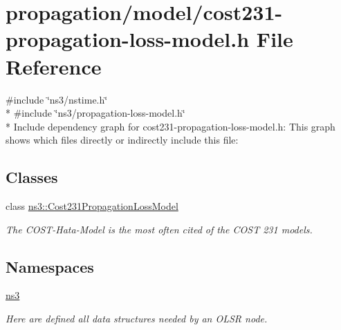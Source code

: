 \hypertarget{cost231-propagation-loss-model_8h}{}\section{propagation/model/cost231-\/propagation-\/loss-\/model.h File Reference}
\label{cost231-propagation-loss-model_8h}
{\ttfamily \#include \char`\"{}ns3/nstime.\+h\char`\"{}}\\*
{\ttfamily \#include \char`\"{}ns3/propagation-\/loss-\/model.\+h\char`\"{}}\\*
Include dependency graph for cost231-\/propagation-\/loss-\/model.h\+:
This graph shows which files directly or indirectly include this file\+:
\subsection*{Classes}
\begin{DoxyCompactItemize}
\item 
class \hyperlink{classns3_1_1Cost231PropagationLossModel}{ns3\+::\+Cost231\+Propagation\+Loss\+Model}
\begin{DoxyCompactList}\small\item\em The C\+O\+S\+T-\/\+Hata-\/\+Model is the most often cited of the C\+O\+ST 231 models. \end{DoxyCompactList}\end{DoxyCompactItemize}
\subsection*{Namespaces}
\begin{DoxyCompactItemize}
\item 
 \hyperlink{namespacens3}{ns3}
\begin{DoxyCompactList}\small\item\em Here are defined all data structures needed by an O\+L\+SR node. \end{DoxyCompactList}\end{DoxyCompactItemize}
